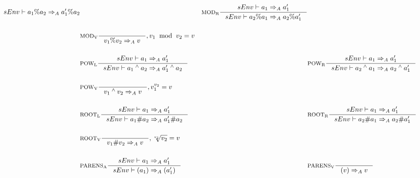 \begin{align*}
                    {sEnv\vdash a_1 \% a_2 \Rightarrow_A a_1' \% a_2}
&
&\inference[$\text{MOD}_\text{R}$]{sEnv\vdash a_1 \Rightarrow_A a_1'}
                    {sEnv\vdash a_2 \% a_1 \Rightarrow_A a_2 \% a_1'}
\\\\
&\inference[$\text{MOD}_\text{V}$]{}
                    {v_1 \% v_2 \Rightarrow_A v}
                    {, v_1 \;\; \textrm{mod} \;\; v_2 = v}
\\\\
&\inference[$\text{POW}_\text{L}$]{sEnv\vdash a_1  \Rightarrow_A a_1'}
                    {sEnv\vdash a_1 \Twedge a_2 \Rightarrow_A a_1' \Twedge a_2}
&
&\inference[$\text{POW}_\text{R}$]{sEnv\vdash a_1 \Rightarrow_A a_1'}
                    {sEnv\vdash a_2 \Twedge a_1 \Rightarrow_A a_2 \Twedge a_1'}
\\\\
&\inference[$\text{POW}_\text{V}$]{}
                    {v_1 \Twedge v_2 \Rightarrow_A v}
                    {, v_1 ^ {v_2} = v}
\\\\
&\inference[$\text{ROOT}_\text{L}$]{sEnv\vdash a_1 \Rightarrow_A a_1'}
                    {sEnv\vdash a_1 \# a_2 \Rightarrow_A a_1' \# a_2}
&
&\inference[$\text{ROOT}_\text{R}$]{sEnv\vdash a_1 \Rightarrow_A a_1'}
                    {sEnv\vdash a_2 \# a_1 \Rightarrow_A a_2 \# a_1'}
\\\\
&\inference[$\text{ROOT}_\text{V}$]{}
                    {v_1 \# v_2 \Rightarrow_A v}
                    {, \sqrt[v_1]{v_2} = v}
\\\\
&\inference[$\text{PARENS}_\text{A}$]{sEnv\vdash a_1 \Rightarrow_A a_1'}
                       {sEnv\vdash (a_1) \Rightarrow_A (a_1')}
&
&\inference[$\text{PARENS}_\text{V}$]{}
                       {(v) \Rightarrow_A v}
\end{align*}
